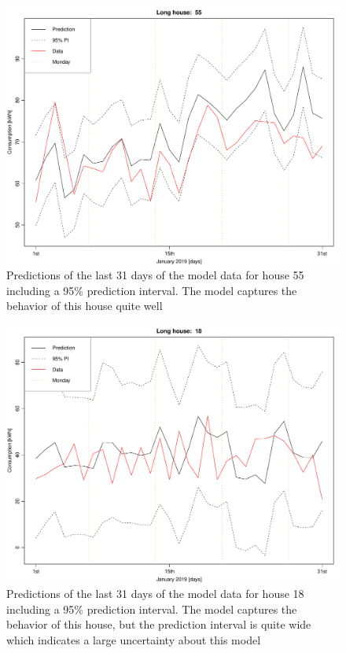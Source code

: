 \begin{figure}
    \centering
    \includegraphics[width=.8\textwidth]{../../../figures/lmpred_55L.pdf}
    \caption{Predictions of the last 31 days of the model data for house 55 including a 95\% prediction interval. The model captures the behavior of this house quite well}
    \label{fig: lmpred_55L}
\end{figure}
\begin{figure}
    \centering
    \includegraphics[width=.8\textwidth]{../../../figures/lmpred_18L.pdf}
    \caption{Predictions of the last 31 days of the model data for house 18 including a 95\% prediction interval. The model captures the behavior of this house, but the prediction interval is quite wide which indicates a large uncertainty about this model}
    \label{fig: lmpred_18L}
\end{figure}

